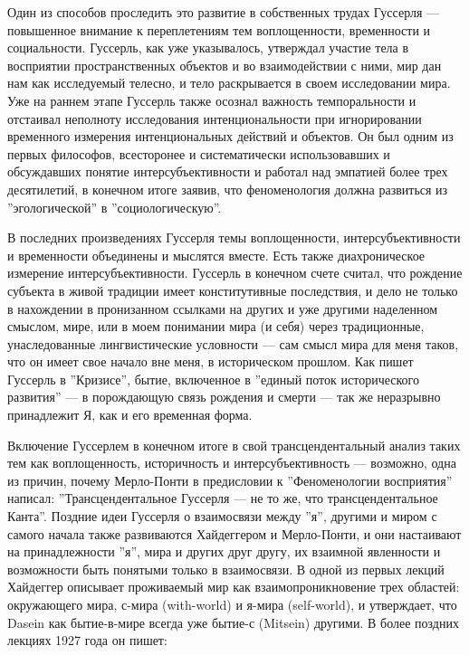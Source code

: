 \documentclass[11pt]{book}
\begin{document}
Один из способов проследить это развитие в собственных трудах Гуссерля --- повышенное внимание к переплетениям тем воплощенности, временности и социальности. Гуссерль, как уже указывалось, утверждал участие тела в восприятии пространственных объектов и во взаимодействии с ними, мир дан нам как исследуемый телесно, и тело раскрывается в своем исследовании мира. Уже на раннем этапе Гуссерль также осознал важность темпоральности и отстаивал неполноту исследования интенциональности при игнорировании временного измерения интенциональных действий и объектов. Он был одним из первых философов, всесторонее и систематически использовавших и обсуждавших понятие интерсубъективности и работал над эмпатией более трех десятилетий, в конечном итоге заявив, что феноменология должна развиться из ''эгологической'' в ''социологическую''.

В последних произведениях Гуссерля темы воплощенности, интерсубъективности и временности объединены и мыслятся вместе. Есть также диахроническое измерение интерсубъективности. Гуссерль в конечном счете считал, что рождение субъекта в живой традиции имеет конститутивные последствия, и дело не только в нахождении в пронизанном ссылками на других и уже другими наделенном смыслом, мире, или в моем понимании мира (и себя) через традиционные, унаследованные лингвистические условности --- сам смысл мира для меня таков, что он имеет свое начало вне меня, в историческом прошлом. Как пишет Гуссерль в ''Кризисе'', бытие, включенное в ''единый поток исторического развития'' --- в порождающую связь рождения и смерти --- так же неразрывно принадлежит Я, как и его временная форма.

Включение Гуссерлем в конечном итоге в свой трансцендентальный анализ таких тем как воплощенность, историчность и интерсубъективность --- возможно, одна из причин, почему Мерло-Понти в предисловии к ''Феноменологии восприятия'' написал: ''Трансцендентальное Гуссерля --- не то же, что трансцендентальное Канта''. Поздние идеи Гуссерля о взаимосвязи между ''я'', другими и миром с самого начала также развиваются Хайдеггером и Мерло-Понти, и они настаивают на принадлежности ''я'', мира и других друг другу, их взаимной явленности и возможности быть понятыми только в взаимосвязи. В одной из первых лекций Хайдеггер описывает проживаемый мир как взаимопроникновение трех областей: окружающего мира, с-мира (with-world) и я-мира (self-world), и утверждает, что Dasein как бытие-в-мире всегда уже бытие-с (Mitsein) другими. В более поздних лекциях 1927 года он пишет:

\smallskip
{}\relax
{}\relax
\end{document}
